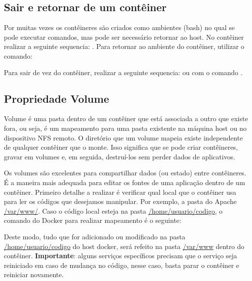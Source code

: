 \documentclass[a4paper,11pt]{article}
\begin{document}
\subsection{Sair e retornar de um contêiner}
Por muitas vezes os contêineres são criados como ambientes (bash) no qual se pode executar comandos, mas pode ser necessário retornar ao host. No contêiner realizar a seguinte sequencia: . Para retornar ao ambiente do contêiner, utilizar o comando: \\

Para sair de vez do contêiner, realizar a seguinte sequencia: 
 ou com o comando .

\subsection{Propriedade Volume}
Volume é uma pasta dentro de um contêiner que está associada a outro que existe fora, ou seja, é um mapeamento para uma pasta existente na máquina host ou no dispositivo NFS remoto. O diretório que um volume mapeia existe independente de qualquer contêiner que o monte. Isso significa que se pode criar contêineres, gravar em volumes e, em seguida, destruí-los sem perder dados de aplicativos.

Os volumes são excelentes para compartilhar dados (ou estado) entre contêineres. É a maneira mais adequada para editar os fontes de uma aplicação dentro de um contêiner. Primeiro detalhe a realizar é verificar qual local que o contêiner usa para ler os códigos que desejamos manipular. Por exemplo, a pasta do Apache \url{/var/www/}. Caso o código local esteja na pasta \url{/home/usuario/codigo}, o comando do Docker para realizar mapeamento é o seguinte: \\

Deste modo, tudo que for adicionado ou modificado na pasta \url{/home/usuario/codigo} do host docker, será refeito na pasta \url{/var/www} dentro do contêiner. \textbf{Importante}: alguns serviços específicos precisam que o serviço seja reiniciado em caso de mudança no código, nesse caso, basta parar o contêiner e reiniciar novamente.
\end{document}
